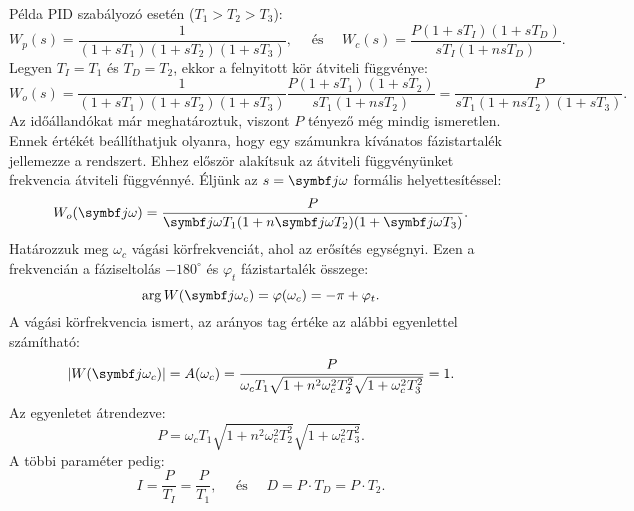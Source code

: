 Példa PID szabályozó esetén ($T_1 > T_2 > T_3$):
\begin{equation}
  W_p(s) = \frac{1}{(1 + sT_1)(1 + sT_2)(1 + sT_3)},
  \quad \text{ és } \quad
  W_c(s) = \frac{P (1 + sT_I)(1 + sT_D)}{sT_I(1 + nsT_D)}
  .
\end{equation}
Legyen $T_I = T_1$ és $T_D = T_2$, ekkor a felnyitott kör átviteli függvénye:
\begin{equation}
  W_o(s)
  = \frac{1}{(1 + sT_1)(1 + sT_2)(1 + sT_3)}
  \frac{P(1 + sT_1)(1 + sT_2)}{sT_1(1 + nsT_2)}
  = \frac{P}{sT_1(1 + nsT_2)(1 + sT_3)}
  .
\end{equation}
Az időállandókat már meghatároztuk, viszont $P$ tényező még mindig ismeretlen.
Ennek értékét beállíthatjuk olyanra, hogy egy számunkra kívánatos
fázistartalék jellemezze a rendszert. Ehhez először alakítsuk az átviteli
függvényünket frekvencia átviteli függvénnyé. Éljünk az $s = \iu \omega$
formális helyettesítéssel:
\begin{equation}
  W_o(\iu \omega)
  = \frac{P}{\iu \omega T_1(1 + n \iu \omega T_2)(1 + \iu \omega T_3)}
  .
  \label{eq:PID-iuw}
\end{equation}
Határozzuk meg $\omega_c$ vágási körfrekvenciát, ahol az erősítés egységnyi.
Ezen a frekvencián a fáziseltolás $-180^\circ$ és $\varphi_t$ fázistartalék
összege:
\begin{equation}
  \arg W(\iu \omega_c)
  = \varphi(\omega_c)
  = -\pi + \varphi_t
  .
  \label{eq:PID-phi}
\end{equation}
A vágási körfrekvencia ismert, az arányos tag értéke az alábbi egyenlettel
számítható:
\begin{equation}
  \abs{W(\iu \omega_c)}
  = A(\omega_c)
  = \frac{P}{
    \omega_c T_1
    \sqrt{1 + n^2 \omega_c^2 T_2^2}
    \sqrt{1 + \omega_c^2 T_3^2}
  } = 1
  .
  \label{eq:PID-A}
\end{equation}
Az egyenletet átrendezve:
\begin{equation}
  P = \omega_c T_1 \sqrt{1 + n^2 \omega_c^2 T_2^2} \sqrt{1 + \omega_c^2 T_3^2}
  .
  \label{eq:PID-P}
\end{equation}
A többi paraméter pedig:
\begin{equation}
  I = \frac{P}{T_I} = \frac{P}{T_1}
  ,\quad \text{ és } \quad
  D = P \cdot T_D = P \cdot T_2
  .
  \label{eq:PID-TD}
\end{equation}

